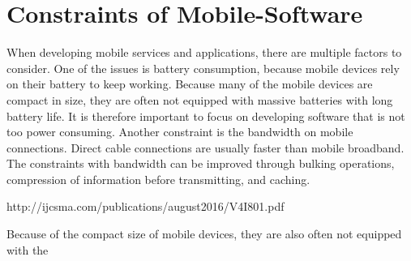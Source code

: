 \section{Constraints of Mobile-Software}

When developing mobile services and applications, there are multiple factors to consider. One of the issues is battery consumption, because mobile devices rely on their battery to keep working. Because many of the mobile devices are compact in size, they are often not equipped with massive batteries with long battery life. It is therefore important to focus on developing software that is not too power consuming. Another constraint is the bandwidth on mobile connections. Direct cable connections are usually faster than mobile broadband. The constraints with bandwidth can be improved through bulking operations, compression of information before transmitting, and caching. 

http://ijcsma.com/publications/august2016/V4I801.pdf

Because of the compact size of mobile devices, they are also often not equipped with the 